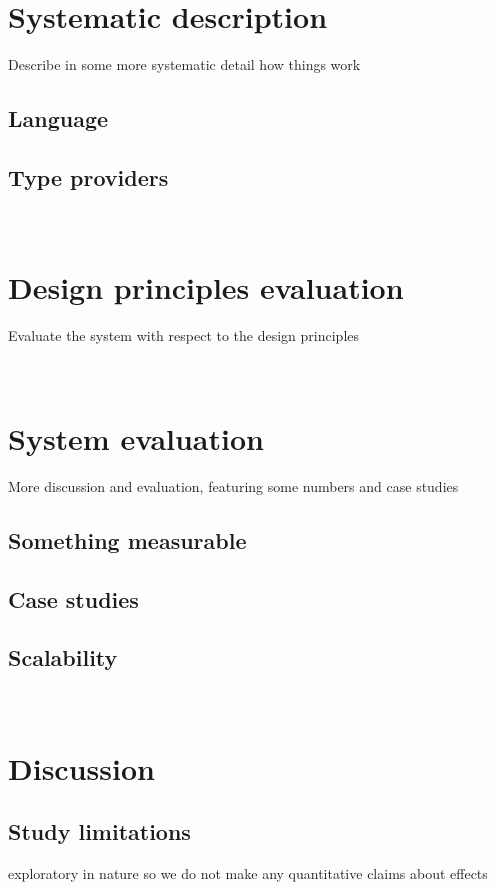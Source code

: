 \documentclass{sigchi}
\begin{document}
\section{Systematic description}
Describe in some more systematic detail how things work

\subsection{Language}

\subsection{Type providers}

~

\section{Design principles evaluation}
Evaluate the system with respect to the design principles

~

\section{System evaluation}
More discussion and evaluation, featuring some numbers and case studies

\subsection{Something measurable}

\subsection{Case studies}

\subsection{Scalability}

~

\section{Discussion}

\subsection{Study limitations}
exploratory in nature so we do not make any quantitative claims about effects
\end{document}
